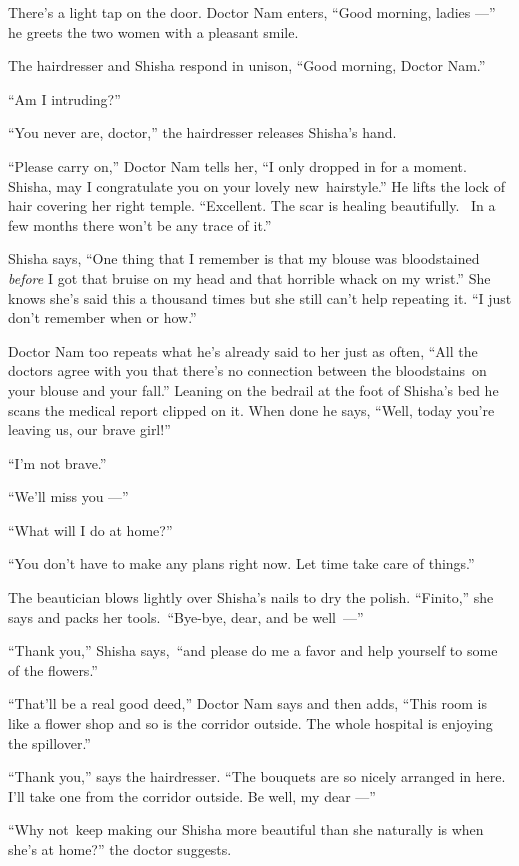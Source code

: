 \documentclass[twoside,11pt,openany]{book}
\begin{document}
There's a light tap on the door. Doctor Nam enters, ``Good morning, ladies ---'' he greets the
two women with a pleasant smile.

The hairdresser and Shisha respond in unison, ``Good morning, Doctor Nam.''

``Am I intruding?''

``You never are, doctor,'' the hairdresser releases Shisha's hand.

``Please carry on,'' Doctor Nam tells her, ``I only dropped in for a moment.
Shisha, may I congratulate you on your lovely new~hairstyle.'' He lifts the lock of hair covering her
right temple. ``Excellent. The scar is healing beautifully. ~In a few months there won't be any trace of
it.''

Shisha says, ``One thing that I remember is that my blouse was bloodstained \textit{before} I got that
bruise on my head and that horrible whack on my wrist.'' She knows she's said this a thousand times but
she still can't help repeating it. ``I just don't remember when or how.''

Doctor Nam too repeats what he's already said to her just as often, ``All the doctors agree with you that
there's no connection between the bloodstains~on your blouse and your fall.'' Leaning on the bedrail at
the foot of Shisha's bed he scans the medical report clipped on it. When done he says, ``Well, today
you're leaving us, our brave girl!''

``I'm not brave.''

``We'll miss you ---''

``What will I do at home?''

``You don't have to make any plans right now. Let time take care of things.''

The beautician blows lightly over Shisha's nails to dry the polish. ``Finito,''
she says and packs her tools.~``Bye-bye, dear, and be \hbox{well ---''}

``Thank you,'' Shisha says,~``and please do me a favor and help yourself to some
of the flowers.''

``That'll be a real good deed,'' Doctor Nam says and then adds, ``This room is
like a flower shop and so is the corridor outside. The whole hospital is enjoying the spillover.''

``Thank you,'' says the hairdresser. ``The bouquets are so nicely arranged in
here. I'll take one from the corridor outside. Be well, my dear ---''

``Why not~keep making our Shisha more beautiful than she naturally is when she's at home?''
the doctor suggests.
\end{document}
